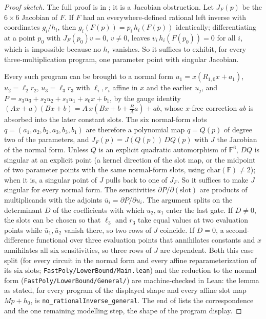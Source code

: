\begin{proof}[Proof sketch]
The full proof is in ; it is a Jacobian obstruction.
Let $J_F(p)$ be the $6\times6$ Jacobian of $F$.  If $F$ had an
everywhere-defined rational left inverse with coordinates $g_i/h_i$, then
$g_i(F(p))=p_i\,h_i(F(p))$ identically; differentiating at a point $p_0$ with
$J_F(p_0)v=0$, $v\neq0$, leaves $v_i\,h_i(F(p_0))=0$ for all $i$, which is
impossible because no $h_i$ vanishes.  So it suffices to exhibit, for every
three-multiplication program, one parameter point with singular Jacobian.

Every such program can be brought to a normal form
$u_1=x(R_{1,0}x+a_1)$, $u_2=\ell_2r_2$, $u_3=\ell_3r_3$ with $\ell_i,r_i$
affine in $x$ and the earlier $u_j$, and
$P=s_3u_3+s_2u_2+s_1u_1+s_0x+b_1$, by the gauge identity
$(Ax+a)(Bx+b)=A\,x(Bx+b+\frac BAa)+ab$, whose $x$-free correction $ab$ is
absorbed into the later constant slots.  The six normal-form slots
$q=(a_1,a_2,b_2,a_3,b_3,b_1)$ are therefore a polynomial map $q=Q(p)$ of
degree two of the parameters, and $J_F(p)=J(Q(p))\,DQ(p)$ with $J$ the
Jacobian of the normal form.  Unless $Q$ is an explicit quadratic
automorphism of $\mathbb{F}^6$, $DQ$ is singular at an explicit point (a
kernel direction of the slot map, or the midpoint of two parameter points
with the same normal-form slots, using $\mathrm{char}(\mathbb{F})\neq2$);
when it is, a singular point of $J$ pulls back to one of $J_F$.  So it
suffices to make $J$ singular for every normal form.  The sensitivities
$\partial P/\partial(\text{slot})$ are products of multiplicands with
the adjoints $\bar u_i=\partial P/\partial u_i$.  The argument splits on the
determinant $D$ of the coefficients with which $u_2,u_1$ enter the last gate.
If $D\neq0$, the slots can be chosen so that $\ell_3$ and $r_3$ take equal
values at two evaluation points while $\bar u_1,\bar u_2$ vanish there, so
two rows of $J$ coincide.  If $D=0$, a second-difference functional over
three evaluation points that annihilates constants and $x$ annihilates all
six sensitivities, so three rows of $J$ are dependent.  Both this case
split (for every circuit in the normal form and every affine reparameterization of
its six slots; \texttt{FastPoly/LowerBound/Main.lean}) and the reduction to the
normal form (\texttt{FastPoly/LowerBound/General/}) are machine-checked in Lean:
the lemma as stated, for every program of the displayed shape and every affine
slot map $Mp+h_0$, is \texttt{no\_rationalInverse\_general}.  The end of
 lists the correspondence and the one remaining modelling
step, the shape of the program display.
\end{proof}

